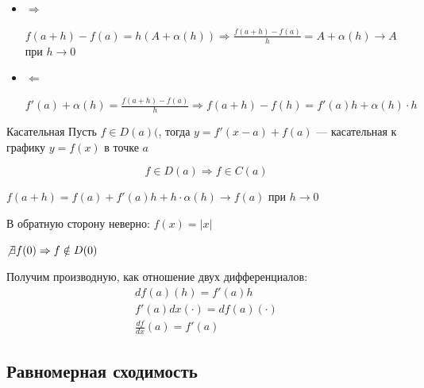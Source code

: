 \begin{itemize}
    \item
        \( \Rightarrow \)

        \( f(a + h) - f(a) = h(A + \alpha(h)) \Rightarrow \frac{f(a + h) - f(a)}{h} = A + \alpha(h) \to A \) при \( h \to 0 \)
    \item
        \( \Leftarrow \)

        \( f'(a) + \alpha(h) = \frac{f(a + h) - f(a)}{h} \Rightarrow f(a + h) - f(h) = f'(a) h + \alpha(h) \cdot h \)
\end{itemize}

\begin{defn}{Касательная}{}
    Пусть \( f \in D(a)( \), тогда \( y = f'(x - a) + f(a) \) --- касательная к графику \( y = f(x) \) 
    в точке \( a \)
\end{defn}

\begin{thrm}{}{}
    \[
        f \in D(a) \Rightarrow f \in C(a)
    \]
\end{thrm}

\( f(a + h) = f(a) + f'(a)h + h \cdot \alpha(h) \to f(a) \) при \( h \to 0 \)

\begin{example}{}{}
    В обратную сторону неверно: \( f(x) = |x| \)

    \( \not\exists f(0) \Rightarrow f \notin D(0) \)
\end{example}

Получим производную, как отношение двух дифференциалов:
\begin{gather*}
    df(a)(h) = f'(a) h
    \\
    f'(a) dx(\cdot) = df(a)(\cdot)
    \\
    \frac{df}{dx} (a) = f'(a)
\end{gather*}

\subsection{Равномерная сходимость}

